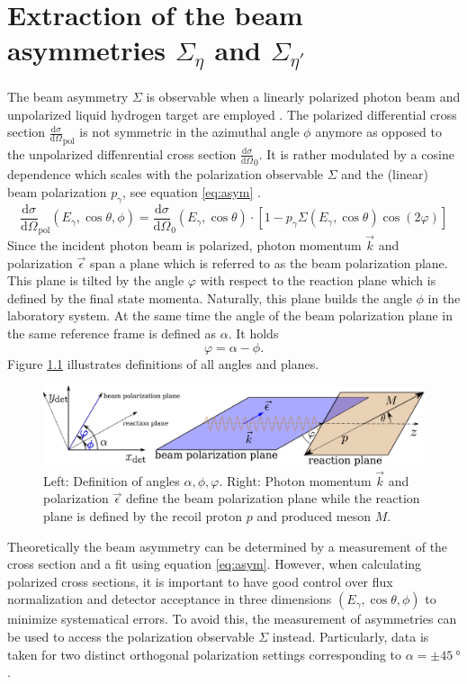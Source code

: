 
\chapter{Extraction of the beam asymmetries $\Sigma_{\eta}$ and $\Sigma_{\eta'}$}
The beam asymmetry $\Sigma$ is observable when a linearly polarized photon beam and unpolarized liquid hydrogen target are employed \cite{san}. The polarized differential cross section $\frac{\text{d}\sigma}{\text{d}\Omega}_\text{pol}$ is not symmetric in the azimuthal angle $\phi$ anymore as opposed to the unpolarized diffenrential cross section $\frac{\text{d}\sigma}{\text{d}\Omega}_0$. It is rather modulated by a cosine dependence which scales with the polarization observable $\Sigma$ and the (linear) beam polarization $p_\gamma$, see equation \eqref{eq:asym} \cite{san}.
\begin{equation}
	\frac{\text{d}\sigma}{\text{d}\Omega}_\text{pol}\left(E_\gamma,\cos\theta,\phi\right)=\frac{\text{d}\sigma}{\text{d}\Omega}_0\left(E_\gamma,\cos\theta\right)\cdot\left[1-p_\gamma\Sigma\left(E_\gamma,\cos\theta\right)\cos\left(2\varphi\right)\right]
	\label{eq:asym}
\end{equation}
Since the incident photon beam is polarized, photon momentum $\vec{k}$ and polarization $\vec{\epsilon}$ span a plane which is referred to as the beam polarization plane. This plane is tilted by the angle $\varphi$ with respect to the reaction plane which is defined by the final state momenta. Naturally, this plane builds the angle $\phi$ in the laboratory system. At the same time the angle of the beam polarization plane in the same reference frame is defined as $\alpha$. It holds 
\begin{equation}
	\varphi=\alpha-\phi.
\end{equation} Figure \ref{fig:angles} illustrates definitions of all angles and planes. 
 \begin{figure}[htbp]
	\centering
	\includegraphics[width=\linewidth]{../DPG2022/figs/angles.pdf}
	\caption{Left: Definition of angles $\alpha,\phi,\varphi$. Right: Photon momentum $\vec{k}$ and polarization  $\vec{\epsilon}$ define the beam polarization plane while the reaction plane is defined by the recoil proton $p$ and produced meson $M$.}
	\label{fig:angles}
\end{figure} 
Theoretically the beam asymmetry can be determined by a measurement of the cross section and a fit using equation \eqref{eq:asym}. However, when calculating polarized cross sections, it is important to have good control over flux normalization and detector acceptance in three dimensions $(E_\gamma,\cos\theta,\phi)$ to minimize systematical errors. To avoid this, the measurement of asymmetries can be used to access the polarization observable $\Sigma$ instead. Particularly, data is taken for two distinct orthogonal polarization settings corresponding to $\alpha=\pm\SI{45}{\degree}$.

